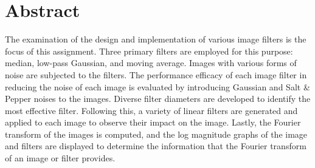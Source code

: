 \section*{Abstract}
The examination of the design and implementation of various image filters is the focus of 
this assignment. Three primary filters are employed for this purpose: median, 
low-pass Gaussian, and moving average. Images with various forms of noise are subjected 
to the filters. The performance efficacy of each image filter in reducing the noise of 
each image is evaluated by introducing Gaussian and Salt \& Pepper noises to the images. 
Diverse filter diameters are developed to identify the most effective filter. 
Following this, a variety of linear filters are generated and applied to each image to observe 
their impact on the image. Lastly, the Fourier transform of the images is computed, 
and the log magnitude graphs of the image and filters are displayed to determine 
the information that the Fourier transform of an image or filter provides.

